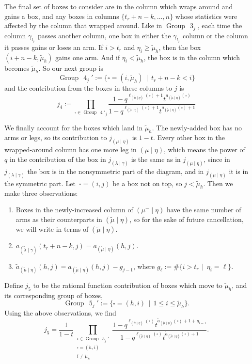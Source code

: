 \documentclass[ALCO]{cedram}
\newcommand{\nudom}{{( \lambda \mid \gamma )}}
\newcommand{\lambdagamma}{{\nudom}}
\newcommand{\mueta}{{(\mu \mid \eta)}}
\newcommand{\mutilde}{{\widetilde{\mu}}}
\newcommand{\lambdatilde}{{\widetilde{\lambda}}}
\newcommand{\lambdatildegamma}{{(\lambdatilde \mid \gamma)}}
\newcommand{\mumineta}{(\mu^- \mid \eta)}
\newcommand{\mutildeeta}{{(\mutilde \mid \eta)}}
\newcommand{\leg}[1]{{\ell_{#1}(\square)}}
\newcommand{\armone}[1]{{\widetilde{a}_{#1}(\square)}}
\newcommand{\armtwo}[1]{{a_{#1}(\square)}}
\newcommand{\group}[1]{\operatorname{Group}\,\operatorname{#1}}
\newcommand{\jfour}{j_4}
\newcommand{\jfive}{j_5}
\begin{document}
The final set of boxes to consider are in the column which wraps around and gains a box, and any boxes in columns $\{t_r+n-k, \dotsc, n\}$ whose statistics were affected by the column that wrapped around. Like in $\group{3}_j$, each time the column $\gamma_{t_r}$ passes another column, one box in either the $\gamma_{t_r}$ column or the column it passes gains or loses an arm. If $i>t_r$ and $\eta_i \geq \mutilde_h$, then the box $(i+n-k,\mutilde_h)$ gains one arm. And if $\eta_i < \mutilde_h$, the box is in the column which becomes $\mutilde_h$. So our next group is
\[ \group{4}_j' :=  \{ \square = (i,\mutilde_h)\, \mid \, t_r+n-k < i\}\]
and the contribution from the boxes in these columns to $j$ is
\[ \jfour := \prod_{\square \in \group{4}'_j} \frac{1-q^{\leg{\mutildeeta}+1}t^{\armtwo{\mutildeeta}}}{1-q^{\leg{\mutildeeta}+1}t^{\armtwo{\mutildeeta}+1}}\]

We finally account for the boxes which land in $\mutilde_h$. The newly-added box has no arms or legs, so its contribution to $j_\mueta$ is $1-t$. Every other box in the wrapped-around column has one more leg in $\mueta$, which means the power of $q$ in the contribution of the box in $j_\lambdagamma$ is the same as in $j_\mueta$, since in $j_\lambdagamma$ the box is in the nonsymmetric part of the diagram, and in $j_\mueta$ it is in the symmetric part. Let~$\square=(i,j)$ be a box not on top, so $j<\mutilde_h$. Then we make three observations:
\begin{enumerate}
    \item Boxes in the newly-increased column of $\mumineta$ have the same number of arms as their counterparts in $\mutildeeta$, so for the sake of future cancellation, we will write in terms of $\mutildeeta$.\\
    \item $a_\lambdatildegamma(t_r+n-k,j) = a_\mutildeeta(h,j)$.\\
    \item $\widetilde{a}_\mutildeeta(h,j) = a_\mutildeeta(h,j)-g_{j-1}$, where $g_\ell := \# \{i>t_r \, \mid \, \eta_i = \ell \}$.\\
\end{enumerate}
Define $\jfive$ to be the rational function contribution of boxes which move to $\mutilde_h$, and its corresponding group of boxes,
\[ \group{5}_j' := \{ \square = (h,i) \, \mid \, 1\leq i \leq \mutilde_h\}.\] Using the above observations, we find
\[ \jfive = \frac{1}{1-t} \prod_{\substack{\square \in \group{5}_j' \\ \square = (h,i) \\
i\neq \mutilde_h}} \frac{1-q^{\leg{\mutildeeta}}t^{\armone{\mutildeeta}+1+g_{i-1}}}{1-q^{\leg{\mutildeeta}}t^{\armone{\mutildeeta}+1}}.\]
\end{document}
